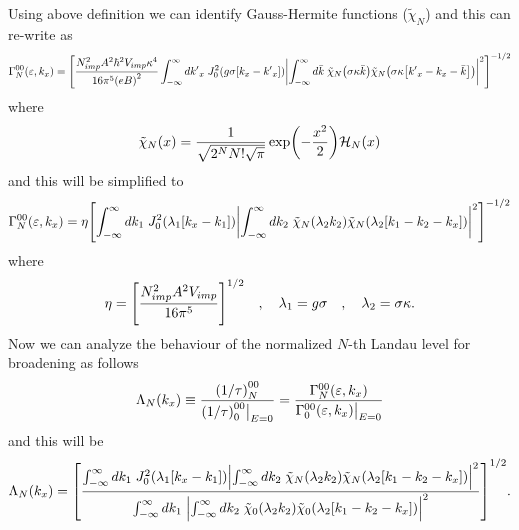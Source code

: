 \noindent
Using above definition we can identify Gauss-Hermite functions ($\tilde{\chi}_N$) and this can re-write as
\begin{equation} \label{5.11}
  \begin{aligned}
    \Gamma^{00}_{N}(\varepsilon,k_x)  =
    \qty[
    \frac { N_{imp}^2 A^2 \hbar^2 V_{imp} \kappa^4}{16\pi^5 \qty(eB)^2}
    \int_{-\infty}^{\infty} d {k'}_x \;
    J_0^2\qty(g\sigma[{k}_x - {k'}_x])
    \qty|
    \int_{-\infty}^{\infty} d\bar{k} \;
    \tilde{\chi}_{N}\qty(\sigma\kappa\bar{k})
    \tilde{\chi}_{N}\qty(\sigma\kappa\qty[{k'}_x - {k}_x - \bar{k}])|^2
    ]^{-1/2}
  \end{aligned}
\end{equation}
where
\begin{equation} \label{5.12}
  \tilde{\chi}_N(x) = \frac{1}{\sqrt{2^{N}N!\sqrt{\pi}}}
  \exp(-\frac{x^2}{2})
  \mathcal{H}_N\qty(x)
\end{equation}
and this will be simplified to
\begin{equation} \label{5.13}
  \begin{aligned}
    \Gamma^{00}_{N}(\varepsilon,k_x)  =
    \eta
    \qty[
    \int_{-\infty}^{\infty} d {k}_1 \;
    J_0^2\qty(\lambda_1[{k}_x - {k}_1])
    \qty|
    \int_{-\infty}^{\infty} d{k}_2 \;
    \tilde{\chi}_{N}\qty(\lambda_2 k_2)
    \tilde{\chi}_{N}\qty(\lambda_2 \qty[{k}_1 - {k}_2 - {k}_x])|^2
    ]^{-1/2}
  \end{aligned}
\end{equation}
where
\begin{equation} \label{5.14}
    \eta = \qty[\frac { N_{imp}^2 A^2 V_{imp}}{16\pi^5}]^{1/2} \quad,\quad
    \lambda_1 = g\sigma \quad,\quad
    \lambda_2 = \sigma \kappa.
\end{equation}
\noindent
Now we can analyze the behaviour of the normalized $N$-th Landau level for broadening as follows
\begin{equation} \label{5.15}
    \Lambda_N(k_x) \equiv
    \frac{\qty(1/\tau)^{00}_{N}}{\qty(1/\tau)^{00}_{0}\big|_{E=0}} =
    \frac{\Gamma^{00}_{N}(\varepsilon,k_x)}{\Gamma^{00}_{0}(\varepsilon,k_x)\big|_{E=0}}
\end{equation}
and this will be
\begin{equation} \label{5.16}
    \Lambda_N (k_x) =
    \qty[
    \frac
    {\int_{-\infty}^{\infty} d {k}_1 \;
    J_0^2\qty(\lambda_1[{k}_x - {k}_1])
    \qty|
    \int_{-\infty}^{\infty} d{k}_2 \;
    \tilde{\chi}_{N}\qty(\lambda_2 k_2)
    \tilde{\chi}_{N}\qty(\lambda_2 \qty[{k}_1 - {k}_2 - {k}_x])|^2}
    {\int_{-\infty}^{\infty} d {k}_1 \;
    \qty|
    \int_{-\infty}^{\infty} d{k}_2 \;
    \tilde{\chi}_{0}\qty(\lambda_2 k_2)
    \tilde{\chi}_{0}\qty(\lambda_2 \qty[{k}_1 - {k}_2 - {k}_x])|^2}
    ]^{1/2}.
\end{equation}

